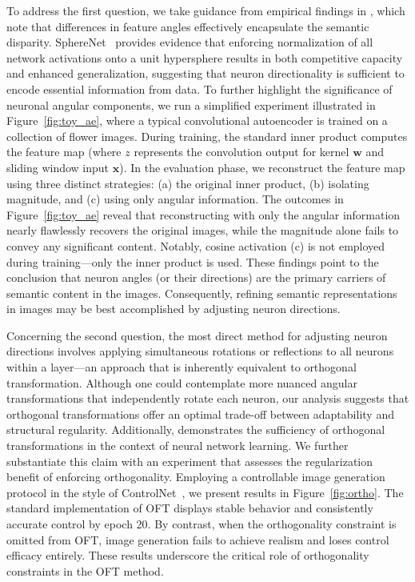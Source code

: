 To address the first question, we take guidance from empirical findings in \cite{liu2018decoupled,chen2020angular}, which note that differences in feature angles effectively encapsulate the semantic disparity. SphereNet~\cite{liu2017deep} provides evidence that enforcing normalization of all network activations onto a unit hypersphere results in both competitive capacity and enhanced generalization, suggesting that neuron directionality is sufficient to encode essential information from data. To further highlight the significance of neuronal angular components, we run a simplified experiment illustrated in Figure~\ref{fig:toy_ae}, where a typical convolutional autoencoder is trained on a collection of flower images. During training, the standard inner product computes the feature map (where $z$ represents the convolution output for kernel $\bm{w}$ and sliding window input $\bm{x}$). In the evaluation phase, we reconstruct the feature map using three distinct strategies: (a) the original inner product, (b) isolating magnitude, and (c) using only angular information. The outcomes in Figure~\ref{fig:toy_ae} reveal that reconstructing with only the angular information nearly flawlessly recovers the original images, while the magnitude alone fails to convey any significant content. Notably, cosine activation (c) is not employed during training—only the inner product is used. These findings point to the conclusion that neuron angles (or their directions) are the primary carriers of semantic content in the images. Consequently, refining semantic representations in images may be best accomplished by adjusting neuron directions.

Concerning the second question, the most direct method for adjusting neuron directions involves applying simultaneous rotations or reflections to all neurons within a layer—an approach that is inherently equivalent to orthogonal transformation. Although one could contemplate more nuanced angular transformations that independently rotate each neuron, our analysis suggests that orthogonal transformations offer an optimal trade-off between adaptability and structural regularity. Additionally, \cite{liu2021orthogonal} demonstrates the sufficiency of orthogonal transformations in the context of neural network learning. We further substantiate this claim with an experiment that assesses the regularization benefit of enforcing orthogonality. Employing a controllable image generation protocol in the style of ControlNet~\cite{zhang2023adding}, we present results in Figure~\ref{fig:ortho}. The standard implementation of OFT displays stable behavior and consistently accurate control by epoch 20. By contrast, when the orthogonality constraint is omitted from OFT, image generation fails to achieve realism and loses control efficacy entirely. These results underscore the critical role of orthogonality constraints in the OFT method.

